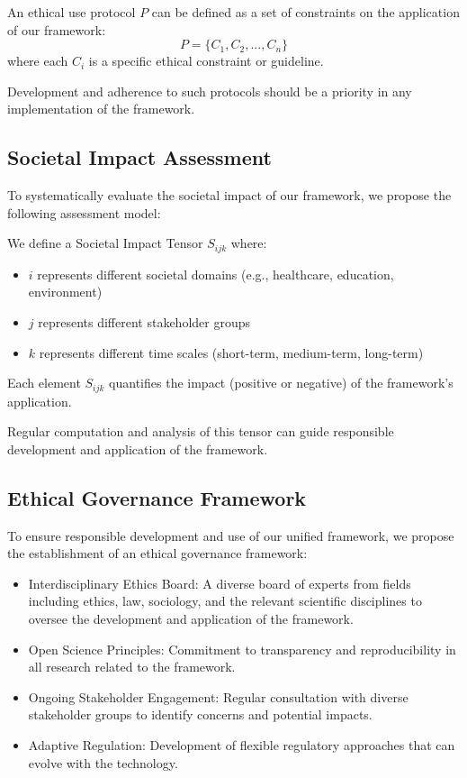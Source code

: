 \begin{proposition}
An ethical use protocol $P$ can be defined as a set of constraints on the application of our framework:
\begin{equation}
    P = \{C_1, C_2, ..., C_n\}
\end{equation}
where each $C_i$ is a specific ethical constraint or guideline.
\end{proposition}

Development and adherence to such protocols should be a priority in any implementation of the framework.

\subsection{Societal Impact Assessment}

To systematically evaluate the societal impact of our framework, we propose the following assessment model:

\begin{definition}
We define a Societal Impact Tensor $S_{ijk}$ where:
\begin{itemize}
    \item $i$ represents different societal domains (e.g., healthcare, education, environment)
    \item $j$ represents different stakeholder groups
    \item $k$ represents different time scales (short-term, medium-term, long-term)
\end{itemize}
Each element $S_{ijk}$ quantifies the impact (positive or negative) of the framework's application.
\end{definition}

Regular computation and analysis of this tensor can guide responsible development and application of the framework.

\subsection{Ethical Governance Framework}

To ensure responsible development and use of our unified framework, we propose the establishment of an ethical governance framework:

\begin{itemize}
    \item Interdisciplinary Ethics Board: A diverse board of experts from fields including ethics, law, sociology, and the relevant scientific disciplines to oversee the development and application of the framework.
    \item Open Science Principles: Commitment to transparency and reproducibility in all research related to the framework.
    \item Ongoing Stakeholder Engagement: Regular consultation with diverse stakeholder groups to identify concerns and potential impacts.
    \item Adaptive Regulation: Development of flexible regulatory approaches that can evolve with the technology.
\end{itemize}

